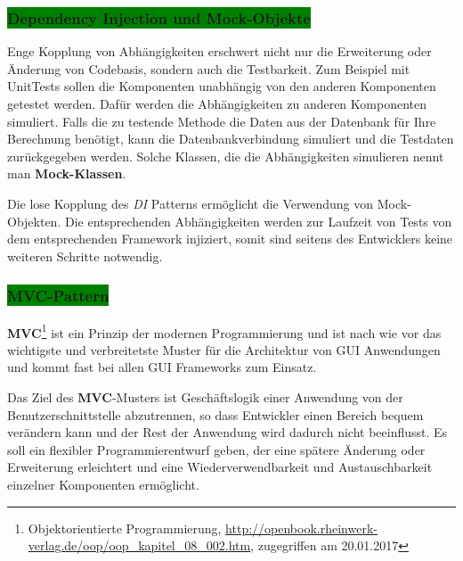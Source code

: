 \subsubsection{\colorbox{green}{Dependency Injection und Mock-Objekte}}\label{di}

Enge Kopplung von Abhängigkeiten erschwert nicht nur die Erweiterung oder Änderung von Codebasis, sondern auch die Testbarkeit. Zum Beispiel mit UnitTests sollen die Komponenten unabhängig von den anderen Komponenten getestet werden. Dafür werden die Abhängigkeiten zu anderen Komponenten simuliert. Falls die zu testende Methode die Daten aus der Datenbank für Ihre Berechnung benötigt, kann die Datenbankverbindung simuliert und die Testdaten zurückgegeben werden. Solche Klassen, die die Abhängigkeiten simulieren nennt man \textbf{Mock-Klassen}.

Die lose Kopplung des \textit{DI} Patterns ermöglicht die Verwendung von Mock-Objekten. Die entsprechenden Abhängigkeiten werden zur Laufzeit von Tests von dem entsprechenden Framework injiziert, somit sind seitens des Entwicklers keine weiteren Schritte notwendig.

\subsubsection{\colorbox{green}{MVC-Pattern}}\label{mvc}

\textbf{MVC}\footnote{Objektorientierte Programmierung, \url{http://openbook.rheinwerk-verlag.de/oop/oop_kapitel_08_002.htm}, zugegriffen am 20.01.2017} ist ein Prinzip der modernen Programmierung und ist nach wie vor das wichtigste und verbreitetste Muster für die Architektur von GUI Anwendungen und kommt fast bei allen GUI Frameworks zum Einsatz.

Das Ziel des \textbf{MVC}-Musters ist Geschäftslogik einer Anwendung von der Benutzerschnittstelle abzutrennen, so dass Entwickler einen Bereich bequem verändern kann und der Rest der Anwendung wird dadurch nicht beeinflusst.
Es soll ein flexibler Programmierentwurf geben, der eine spätere Änderung oder Erweiterung erleichtert und eine Wiederverwendbarkeit und Austauschbarkeit einzelner Komponenten ermöglicht.

